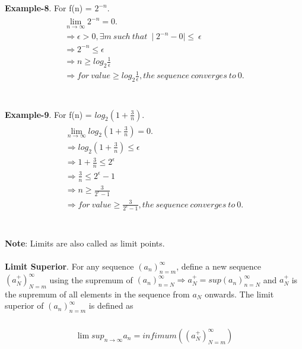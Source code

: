 \documentclass[a4paper]{article}
\begin{document}
\\
\\
\textbf{Example-8}. For f(n) = $2^{-n}$.\\
\begin{align}
\begin{split}
\lim_{n \to \infty}2^{-n} = 0.\\
\Rightarrow \epsilon > 0, \exists m \ such\ that\ \mid 2^{-n}-0 \mid \leq\ \epsilon\\
\Rightarrow 2^{-n} \leq \epsilon\\
\Rightarrow n \geq log_2\frac{1}{\epsilon}\\
\Rightarrow for\ value \geq log_2\frac{1}{\epsilon}, the\ sequence\ converges\ to \ 0.
\end{split}
\end{align}
\\
\\
\textbf{Example-9}. For f(n) = $log_2(1+\frac{3}{n})$.\\
\begin{align}
\begin{split}
\lim_{n \to \infty} log_2(1+\frac{3}{n})= 0.\\
\Rightarrow log_2(1+\frac{3}{n})\leq\epsilon\\
\Rightarrow 1+\frac{3}{n} \leq 2^\epsilon\\
\Rightarrow \frac{3}{n} \leq 2^\epsilon - 1 \\
\Rightarrow n \geq \frac{3}{2^\epsilon -1}\\
\Rightarrow for\ value \geq \frac{3}{2^\epsilon -1}, the\ sequence\ converges\ to \ 0.
\end{split}
\end{align}
\\
\\
\textbf{Note}: Limits are also called as limit points.
\\
\\
\textbf{Limit Superior}.
For any sequence $(a_n)^\infty_{n=m}$, define a new sequence $(a_N^+)^\infty_{N=m}$ using the supremum of  $(a_n)^\infty_{n=N} \Rightarrow a_N^+ = sup (a_n)^\infty_{n=N}$ and $a_N^+$ is the supremum of all elements in the sequence from $a_N$ onwards. The limit superior of $(a_n)^\infty_{n=m}$ is defined as 
	\\
	\\
	\begin{align}
	\begin{split}
	\lim sup_{n \to \infty} a_n = infimum((a_N^+)^\infty_{N=m})
	\end{split}
	\end{align}
\end{document}
